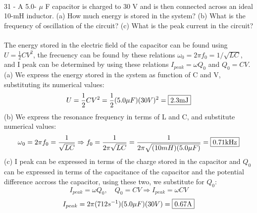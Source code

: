 \documentclass{report}
\begin{document}
\paragraph{}
31 - A 5.0- $\mu$ F capacitor is charged to 30 V and is then connected across an ideal 10-mH inductor. (a) How much energy is stored in the system? (b) What is the frequency of oscillation of the circuit? (c) What is the peak current in the circuit?\\
\\
The energy stored in the electric field of the capacitor can be found using $U = \frac{1}{2}CV^2$, the frecuency can be found by these relations $\omega{_0} = 2\pi f_0 = 1 / \sqrt{LC}$, and I peak can be determined by using these relations $I_{peak} = \omega Q_0$ and $Q_0 = CV$.\\
(a) We express the energy stored in the system as function of C and V, substituting its numerical values:
$$U = \frac{1}{2}CV^2 = \frac{1}{2}(5.0\mu F)(30V)^2 = \fbox{2.3mJ}$$
(b) We express the resonance frequency in terms of L and C, and substitute numerical values:
$$\omega{_0} = 2\pi f_0 = \frac{1}{\sqrt{LC}} \Rightarrow f_0 = \frac{1}{2\pi \sqrt{LC}} = \frac{1}{2\pi\sqrt{(10mH)(5.0\mu F)}} = \fbox{0.71kHz}$$
(c) I peak can be expressed in terms of the charge stored in the capacitor and $Q_0$ can be expressed in terms of the capacitance of the capacitor and the potential difference accross the capacitor, using these two, we substitute for $Q_0$:
$$I_{peak} = \omega Q_0, \quad Q_0 = CV \Rightarrow I_{peak} = \omega CV$$
$$I_{peak} = 2\pi (712s^{-1})(5.0 \mu F)(30V) = \fbox{0.67A}$$
\end{document}
